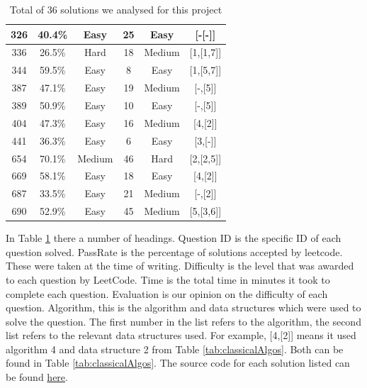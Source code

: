 \documentclass[10pt,twocolumn,hidelinks]{IEEEtran}
\begin{document}
\begin{table}
\begin{tabular}{|c| c| c| c| c| c|}
  	\hline
 	326 & 40.4\% &Easy  &25  &Easy&[-[-]]\\
   	\hline
  	336 & 26.5\% &Hard &18  &Medium&[1,[1,7]]\\
  	\hline
 	344 & 59.5\% &Easy  &8  &Easy&[1,[5,7]]\\
  	\hline
 	387 & 47.1\% &Easy  & 19 &Medium&[-,[5]]\\
  	\hline
 	389 & 50.9\% &Easy  & 10 &Easy& [-,[5]]\\
  	\hline
 	404 & 47.3\% &Easy  &16  &Medium&[4,[2]]\\
	\hline
 	441 & 36.3\% &Easy  &6&Easy &[3,[-]]\\ 	
  	\hline
 	654 & 70.1\% &Medium  &46  &Hard&[2,[2,5]]\\
  	\hline
	669 &  58.1\%& Easy &18  &Easy&[4,[2]]\\
  	\hline
	687 &  33.5\%& Easy &21  &Medium&[-,[2]]\\
  	\hline
 	690 &  52.9\%& Easy &   45&Medium&[5,[3,6]]\\[1ex]
 	\hline
\end{tabular}
\caption{Total of 36 solutions we analysed for this project}
\label{tab:tabSols}
\end{table}
\par In Table \ref{tab:tabSols} there a number of headings. Question ID is the specific ID of each question solved. PassRate is the percentage of solutions accepted by leetcode. These were taken at the time of writing. Difficulty is the level that was awarded to each question by LeetCode. Time is the total time in minutes it took to complete each question. Evaluation is our opinion on the difficulty of each question. Algorithm, this is the algorithm and data structures which were used to solve the question. The first number in the list refers to the algorithm, the second list refers to the relevant data structures used. For example, [4,[2]] means it used algorithm 4 and data structure 2 from Table \ref{tab:classicalAlgos}. Both can be found in Table {\ref{tab:classicalAlgos}}.
The source code for each solution listed can be found \href{https://github.com/Demostroyer/interview-project/tree/master/src/mu_ian_dempsey}{here}. 
\end{document}
